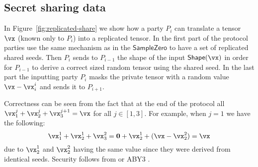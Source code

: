 \subsection{Secret sharing data}

In Figure~\ref{fig:replicated-share} we show how a party $P_i$ can translate a
tensor $\vx$ (known only to $P_i$) into a replicated tensor. In the first part of the protocol parties use the same mechanism as in the $\mathsf{SampleZero}$
to have a set of replicated shared seeds. Then $P_i$ sends to $P_{i-1}$ the shape of the input $\mathsf{Shape}(\vx)$ in order for $P_{i-1}$
to derive a correct sized random tensor using the shared seed.
In the last part the inputting party $P_i$ masks the private tensor with a random value $\vx - \vx_i^i$ and sends it to $P_{i+1}$.

Correctness can be seen from the fact that at the end of the protocol all $\vx_1^j + \vx_2^j + \vx_3^{j+1} = \vx$ for all $j \in [1,3]$. For example, when $j = 1$ we have the following:
$$\vx_1^1 + \vx_2^1 + \vx_3^2 = \mathbf{0} + \vx_2^1 + (\vx - \vx_2^2) = \vx $$ due to $\vx_2^1$ and $\vx_2^2$
having the same value since they were derived from identical seeds. Security follows from \cite{CCS:ABFLNO16} or ABY3 \cite{CCS:MohRin18}.


